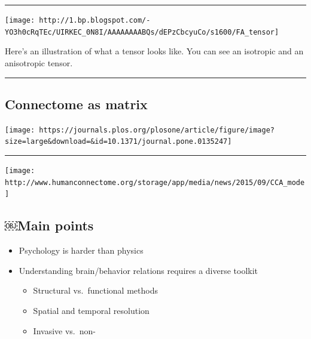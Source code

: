 \documentclass[]{article}
\providecommand{\tightlist}{%
  \setlength{\itemsep}{0pt}\setlength{\parskip}{0pt}}
\begin{document}
\begin{center}\rule{0.5\linewidth}{\linethickness}\end{center}

\begin{center}\texttt{[image: http://1.bp.blogspot.com/-YO3h0cRqTEc/UIRKEC\_0N8I/AAAAAAAABQs/dEPzCbcyuCo/s1600/FA\_tensor]} \end{center}

Here's an illustration of what a tensor looks like. You can see an
isotropic and an anisotropic tensor.

\begin{center}\rule{0.5\linewidth}{\linethickness}\end{center}

\hypertarget{connectome-as-matrix}{%
\subsection{Connectome as matrix}\label{connectome-as-matrix}}

\begin{center}\texttt{[image: https://journals.plos.org/plosone/article/figure/image?size=large\&download=\&id=10.1371/journal.pone.0135247]} \end{center}

\begin{center}\rule{0.5\linewidth}{\linethickness}\end{center}

\begin{center}\texttt{[image: http://www.humanconnectome.org/storage/app/media/news/2015/09/CCA\_mode]} \end{center}

\hypertarget{main-points}{%
\subsection{￼Main points}\label{main-points}}

\begin{itemize}
\tightlist
\item
  Psychology is harder than physics
\item
  Understanding brain/behavior relations requires a diverse toolkit

  \begin{itemize}
  \tightlist
  \item
    Structural vs.~functional methods
  \item
    Spatial and temporal resolution
  \item
    Invasive vs.~non-
  \end{itemize}
\end{itemize}
\end{document}
